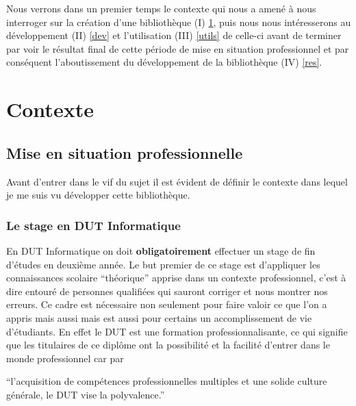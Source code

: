 \documentclass[11pt,a4paper,krantz2,11pt,oneside]{krantz}
\renewenvironment{quote}{\begin{VF}}{\end{VF}}
\begin{document}
Nous verrons dans un premier temps le contexte qui nous a amené à nous interroger sur la création d'une bibliothèque (I) \ref{context}, puis nous nous intéresserons au développement (II) \ref{dev} et l'utilisation (III) \ref{utils} de celle-ci avant de terminer par voir le résultat final de cette période de mise en situation professionnel et par conséquent l'aboutissement du développement de la bibliothèque (IV) \ref{res}.

\hypertarget{context}{%
\chapter{Contexte}\label{context}}

\hypertarget{mise-en-situation-professionnelle}{%
\section{Mise en situation professionnelle}\label{mise-en-situation-professionnelle}}

Avant d'entrer dans le vif du sujet il est évident de définir le contexte dans lequel je me suis vu développer cette bibliothèque.

\hypertarget{le-stage-en-dut-informatique}{%
\subsection{Le stage en DUT Informatique}\label{le-stage-en-dut-informatique}}

En DUT Informatique on doit \textbf{obligatoirement} effectuer un stage de fin d'études en deuxième année. Le but premier de ce stage est d'appliquer les connaissances scolaire ``théorique'' apprise dans un contexte professionnel, c'est à dire entouré de personnes qualifiées qui sauront corriger et nous montrer nos erreurs. Ce cadre est nécessaire non seulement pour faire valoir ce que l'on a appris mais aussi mais est aussi pour certains un accomplissement de vie d'étudiants. En effet le DUT est une formation professionnalisante, ce qui signifie que les titulaires de ce diplôme ont la possibilité et la facilité d'entrer dans le monde professionnel car par

\begin{quote}
``l'acquisition de compétences professionnelles multiples et une solide culture générale, le DUT vise la polyvalence.''

\end{quote}
\end{document}
